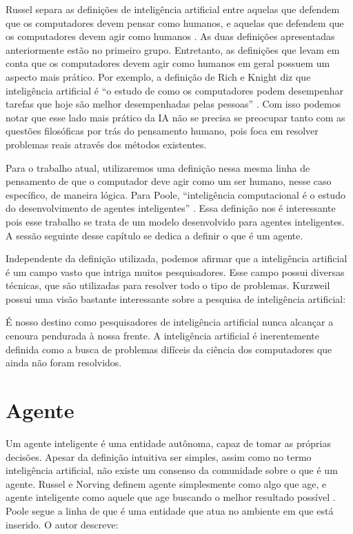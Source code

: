 Russel separa as definições de inteligência artificial entre aquelas que defendem que os computadores devem pensar como humanos, e aquelas que defendem que os computadores devem agir como humanos \cite{russel2013artificial}. As duas definições apresentadas anteriormente estão no primeiro grupo. Entretanto, as definições que levam em conta que os computadores devem agir como humanos em geral possuem um aspecto mais prático. Por exemplo, a definição de Rich e Knight diz que inteligência artificial é ``o estudo de como os computadores podem desempenhar tarefas que hoje são melhor desempenhadas pelas pessoas'' \cite{rich1991artificial}. Com isso podemos notar que esse lado mais prático da IA não se precisa se preocupar tanto com as questões filosóficas por trás do pensamento humano, pois foca em resolver problemas reais através dos métodos existentes. 

Para o trabalho atual, utilizaremos uma definição nessa mesma linha de pensamento de que o computador deve agir como um ser humano, nesse caso específico, de maneira lógica. Para Poole, ``inteligência computacional é o estudo do desenvolvimento de agentes inteligentes'' \cite{poole1998computational}. Essa definição nos é interessante pois esse trabalho se trata de um modelo desenvolvido para agentes inteligentes. A sessão seguinte desse capítulo se dedica a definir o que é um agente.

Independente da definição utilizada, podemos afirmar que a inteligência artificial é um campo vasto que intriga muitos pesquisadores. Esse campo possui diversas técnicas, que são utilizadas para resolver todo o tipo de problemas. Kurzweil possui uma visão bastante interessante sobre a pesquisa de inteligência artificial:

\begin{displayquote}
    É nosso destino como pesquisadores de inteligência artificial nunca alcançar a cenoura pendurada à nossa frente. A inteligência artificial é inerentemente definida como a busca de problemas difíceis da ciência dos computadores que ainda não foram resolvidos. \cite{kurzweil2000age}
\end{displayquote}



\section{Agente}

Um agente inteligente é uma entidade autônoma, capaz de tomar as próprias decisões. Apesar da definição intuitiva ser simples, assim como no termo inteligência artificial, não existe um consenso da comunidade sobre o que é um agente. Russel e Norving definem agente simplesmente como algo que age, e agente inteligente como aquele que age buscando o melhor resultado possível \cite{russel2013artificial}. Poole segue a linha de que é uma entidade que atua no ambiente em que está inserido. O autor descreve:

